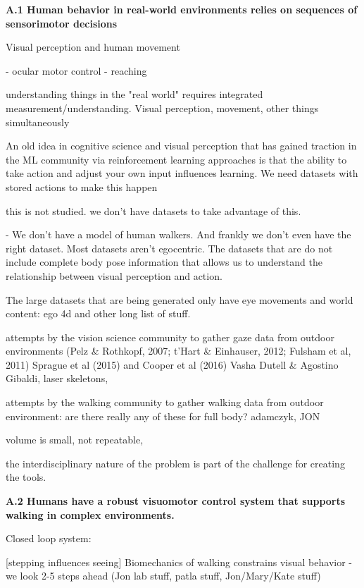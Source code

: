 
\textbf{A.1 Human behavior in real-world environments relies on sequences of sensorimotor decisions}

Visual perception and human movement 

- ocular motor control 
- reaching





understanding things in the "real world" requires integrated measurement/understanding.  Visual perception, movement, other things simultaneously


An old idea in cognitive science and visual perception that has gained traction in the ML community via reinforcement learning approaches is that the ability to take action and adjust your own input influences learning. We need datasets with stored actions to make this happen

this is not studied.  we don't have datasets to take advantage of this.

- We don't have a model of human walkers. And frankly we don't even have the right dataset.  Most datasets aren't egocentric.  The datasets that are do not include complete body pose information that allows us to understand the relationship between visual perception and action.

The large datasets that are being generated only have eye movements and world content: ego 4d and other long list of stuff. 

attempts by the vision science community to gather gaze data from outdoor environments (Pelz \& Rothkopf, 2007; t'Hart \& Einhauser, 2012; Fulsham et al, 2011) Sprague et al (2015) and Cooper et al (2016) Vasha Dutell \& Agostino Gibaldi, laser skeletons, 

attempts by the walking community to gather walking data from outdoor environment: are there really any of these for full body? adamczyk, JON

volume is small, not repeatable, 

the interdisciplinary nature of the problem is part of the challenge for creating the tools.



\textbf{A.2 Humans have a robust visuomotor control system that supports walking in complex environments.}

Closed loop system:

[stepping influences seeing] Biomechanics of walking constrains visual behavior 
- we look 2-5 steps ahead (Jon lab stuff, patla stuff, Jon/Mary/Kate stuff)

